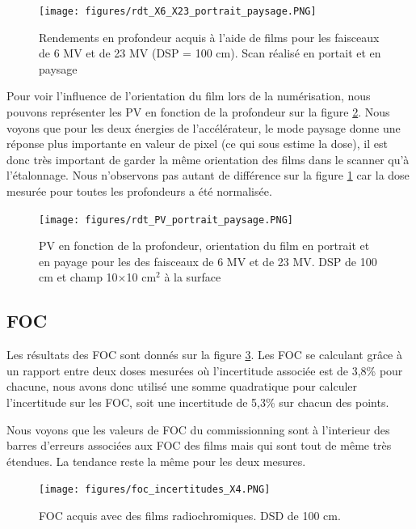 \documentclass{book}
\begin{document}
\begin{figure}[h]
  \centering
  \texttt{[image: figures/rdt\_X6\_X23\_portrait\_paysage.PNG]}
  \caption{Rendements en profondeur acquis à l'aide de films pour les faisceaux de 6 MV et de 23 MV (DSP = 100 cm). Scan réalisé en portait et en paysage}
  \label{fig_rdt_films_X6_X23}
\end{figure}

Pour voir l'influence de l'orientation du film lors de la numérisation, nous pouvons représenter les PV en fonction de la profondeur sur la figure \ref*{fig_fading_PV}. Nous voyons que pour les deux énergies de l'accélérateur, le mode paysage donne une réponse plus importante en valeur de pixel (ce qui sous estime la dose), il est donc très important de garder la même orientation des films dans le scanner qu'à l'étalonnage. Nous n'observons pas autant de différence sur la figure \ref*{fig_rdt_films_X6_X23} car la dose mesurée pour toutes les profondeurs a été normalisée.

\newpage
\begin{figure}[h]
  \centering
  \texttt{[image: figures/rdt\_PV\_portrait\_paysage.PNG]}
  \caption{PV en fonction de la profondeur, orientation du film en portrait et en payage pour les des faisceaux de 6 MV et de 23 MV. DSP de 100 cm et champ 10$\times$10 cm$^2$ à la surface}
  \label{fig_fading_PV}
\end{figure}

\subsection{FOC}

Les résultats des FOC sont donnés sur la figure \ref*{fig_foc_films}. Les FOC se calculant grâce à un rapport entre deux doses mesurées où l'incertitude associée est de 3,8\% pour chacune, nous avons donc utilisé une somme quadratique pour calculer l'incertitude sur les FOC, soit une incertitude de 5,3\% sur chacun des points.

Nous voyons que les valeurs de FOC du commissionning sont à l'interieur des barres d'erreurs associées aux FOC des films mais qui sont tout de même très étendues. La tendance reste la même pour les deux mesures.

\begin{figure}[h]
  \centering
  \texttt{[image: figures/foc\_incertitudes\_X4.PNG]}
  \caption{FOC acquis avec des films radiochromiques. DSD de 100 cm.}
  \label{fig_foc_films}
\end{figure}
\end{document}
